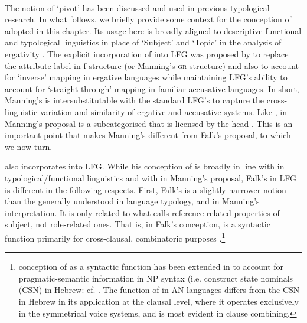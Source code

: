 \documentclass[output=paper,chinesefont]{../langscibook}
\begin{document}
\ea\label{ex:Austronesian:22}
\ea
{}\\
\ex {[\textsc{focus-c}={\SUBJ}]\textsubscript{\PIVOT}}
\z\z
The notion of `pivot' has been discussed and used in previous typological research. In what follows, we briefly provide some context for the conception of \PIVOT adopted in this chapter. Its usage here is broadly aligned to descriptive functional and typological linguistics in place of `Subject' and `Topic' in the analysis of ergativity \citep{Chao1968,Heath1975,dixon1979,FoleyVanValin1984,VanValin1997}. The explicit incorporation of \PIVOT into LFG was proposed by \citet{Manning1994} to replace the \GF attribute label \SUBJ in f-structure (or Manning's \textsc{gr}-structure) and also to account for `inverse' mapping in ergative languages while maintaining LFG's ability to account for `straight-through' mapping in familiar accusative languages. In short, Manning's \PIVOT is intersubstitutable with the standard LFG's \SUBJ to capture the cross-linguistic variation and similarity of ergative and accusative systems. Like \SUBJ, \PIVOT in Manning's proposal is a subcategorised \GF that is licensed by the head \PRED. This is an important point that makes Manning's \PIVOT different from Falk's proposal, to which we now turn.

\largerpage[-1]
\citet{Falk2000,falk06} also incorporates \PIVOT into LFG. While his conception of \PIVOT is broadly in line with \PIVOT in typological/functional linguistics \citep{dixon1979,FoleyVanValin1984,Dixon1984} and with \PIVOT in Manning's proposal, Falk's \PIVOT in LFG is different in the following respects. First, Falk's \PIVOT is a slightly narrower notion than the generally understood \PIVOT in language typology, and in Manning's interpretation. It is only related to what \citet{Schachter1977} calls reference-related properties of subject, not role-related ones. That is, in Falk's conception, \PIVOT is a syntactic function primarily for cross-clausal, combinatoric purposes \citep[76]{falk06}.\footnote{ conception of \PIVOT as a syntactic function has been extended in \citet{Falk07} to account for pragmatic-semantic information in NP syntax (i.e. construct state nominals (CSN) in Hebrew: cf. . The function of \PIVOT in AN languages differs from the CSN in Hebrew in its application at the clausal level, where it operates exclusively in the symmetrical voice systems, and is most evident in clause combining.}
\end{document}
